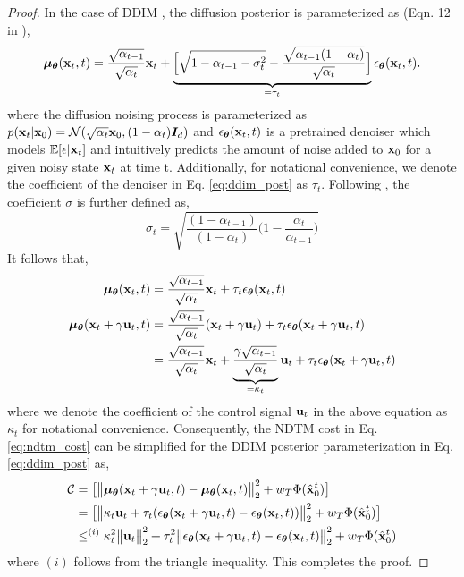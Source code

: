 \begin{proof}
    In the case of DDIM \cite{song2022denoisingdiffusionimplicitmodels}, the diffusion posterior is parameterized as (Eqn. 12 in \citet{song2022denoisingdiffusionimplicitmodels}),
\begin{equation}
{\bm{\mu}}_{\bm{\theta}}({\mathbf{x}}_t, t) = \frac{\sqrt{\alpha_{t-1}}}{\sqrt{\alpha_t}}{\mathbf{x}}_t + \underbrace{\Big[\sqrt{1 - \alpha_{t-1} - \sigma_t^2} - \frac{\sqrt{\alpha_{t-1}(1 - \alpha_t)}}{\sqrt{\alpha_t}}\Big]}_{=\tau_t} \epsilon_{\bm{\theta}}({\mathbf{x}}_t, t).
\label{eq:ddim_post}
\end{equation}
where the diffusion noising process is parameterized as $p({\mathbf{x}}_t|{\mathbf{x}}_0) = {\mathcal{N}}(\sqrt{\alpha_t} {\mathbf{x}}_0, (1 - \alpha_t){\bm{I}}_d)$ and $\epsilon_{\bm{\theta}}({\mathbf{x}}_t, t)$ is a pretrained denoiser which models $\mathbb{E}[\epsilon|{\mathbf{x}}_t]$ and intuitively predicts the amount of noise added to ${\mathbf{x}}_0$ for a given noisy state ${\mathbf{x}}_t$ at time t. Additionally, for notational convenience, we denote the coefficient of the denoiser in Eq. \ref{eq:ddim_post} as $\tau_t$. Following \citet{song2022denoisingdiffusionimplicitmodels}, the coefficient $\sigma$ is further defined as,
\begin{equation}
\sigma_t = \sqrt{\frac{(1 - \alpha_{t-1})}{(1 - \alpha_t)}\Big(1 - \frac{\alpha_t}{\alpha_{t-1}}\Big)}
\end{equation}
It follows that,
\begin{align}
    {\bm{\mu}}_{\bm{\theta}}({\mathbf{x}}_t, t) &= \frac{\sqrt{\alpha_{t-1}}}{\sqrt{\alpha_t}}{\mathbf{x}}_t + \tau_t \epsilon_{\bm{\theta}}({\mathbf{x}}_t, t)\\
    {\bm{\mu}}_{\bm{\theta}}({\mathbf{x}}_t + \gamma{\mathbf{u}}_t, t) &= \frac{\sqrt{\alpha_{t-1}}}{\sqrt{\alpha_t}}({\mathbf{x}}_t + \gamma{\mathbf{u}}_t) + \tau_t \epsilon_{\bm{\theta}}({\mathbf{x}}_t + \gamma{\mathbf{u}}_t, t) \\
    &= \frac{\sqrt{\alpha_{t-1}}}{\sqrt{\alpha_t}}{\mathbf{x}}_t + \underbrace{\frac{\gamma\sqrt{\alpha_{t-1}}}{\sqrt{\alpha_t}}}_{=\kappa_t}{\mathbf{u}}_t + \tau_t \epsilon_{\bm{\theta}}({\mathbf{x}}_t + \gamma{\mathbf{u}}_t, t)
\end{align}
where we denote the coefficient of the control signal ${\mathbf{u}}_t$ in the above equation as $\kappa_t$ for notational convenience. Consequently, the NDTM cost in Eq. \ref{eq:ndtm_cost} can be simplified for the DDIM posterior parameterization in Eq. \ref{eq:ddim_post} as,
\begin{align}
    {\mathcal{C}} &= \big[\big\Vert {\bm{\mu}}_{\bm{\theta}}({\mathbf{x}}_t + \gamma{\mathbf{u}}_t, t) - {\bm{\mu}}_{\bm{\theta}}({\mathbf{x}}_t, t) \big\Vert_2^2 + w_T \Phi(\hat{{\mathbf{x}}}_0^t)\big] \\
    &=  \big[\big\Vert \kappa_t {\mathbf{u}}_t + \tau_t (\epsilon_{\bm{\theta}}({\mathbf{x}}_t + \gamma{\mathbf{u}}_t, t) - \epsilon_{\bm{\theta}}({\mathbf{x}}_t, t)) \big\Vert_2^2 + w_T \Phi(\hat{{\mathbf{x}}}_0^t)\big] \\
    &\leq^{(i)} \kappa_t^2\big\Vert {\mathbf{u}}_t \big\Vert_2^2 + \tau_t^2 \big\Vert\epsilon_{\bm{\theta}}({\mathbf{x}}_t + \gamma{\mathbf{u}}_t, t) - \epsilon_{\bm{\theta}}({\mathbf{x}}_t, t) \big\Vert_2^2 + w_T \Phi(\hat{{\mathbf{x}}}_0^t)
\end{align}
where $(i)$ follows from the triangle inequality. This completes the proof.
\end{proof}

